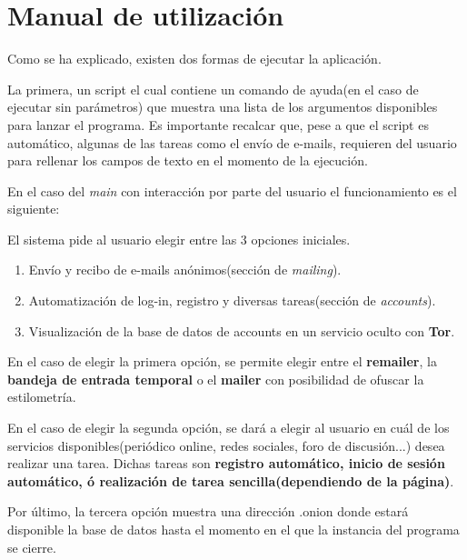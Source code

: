 \chapter{Manual de utilización}
\label{Anexo:manualuso}

Como se ha explicado, existen dos formas de ejecutar la aplicación. 

La primera, un script el cual contiene un comando de ayuda(en el caso de ejecutar sin parámetros) que muestra una lista de los argumentos disponibles para lanzar el programa. Es importante recalcar que, pese a que el script es automático, algunas de las tareas como el envío de e-mails, requieren del usuario para rellenar los campos de texto en el momento de la ejecución.

En el caso del \textit{main} con interacción por parte del usuario el funcionamiento es el siguiente:

El sistema pide al usuario elegir entre las 3 opciones iniciales.
\begin{enumerate}
	\item {Envío y recibo de e-mails anónimos(sección de \textit{mailing}).}
	
	\item {Automatización de log-in, registro y diversas tareas(sección de \textit{accounts})}.
	
	\item {Visualización de la base de datos de accounts en un servicio oculto con \textbf{Tor}}.
\end{enumerate}

En el caso de elegir la primera opción, se permite elegir entre el \textbf{remailer}, la \textbf{bandeja de entrada temporal} o el \textbf{mailer} con posibilidad de ofuscar la estilometría.

En el caso de elegir la segunda opción, se dará a elegir al usuario en cuál de los servicios disponibles(periódico online, redes sociales, foro de discusión...) desea realizar una tarea. Dichas tareas son \textbf{registro automático, inicio de sesión automático, ó realización de tarea sencilla(dependiendo de la página)}.

Por último, la tercera opción muestra una dirección .onion donde estará disponible la base de datos hasta el momento en el que la instancia del programa se cierre.

\newpage \thispagestyle{empty} %
